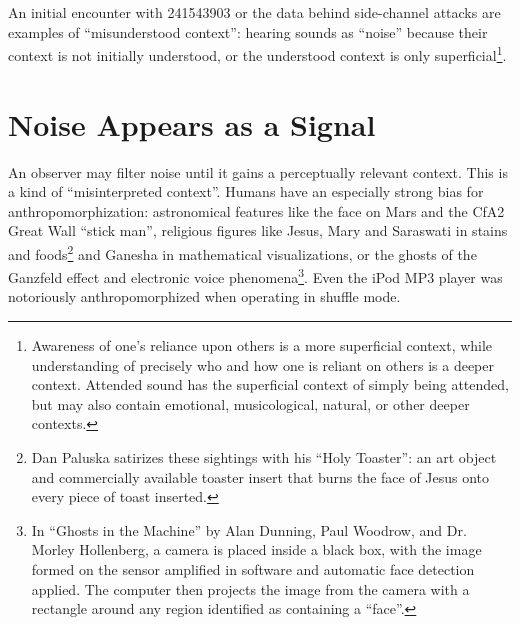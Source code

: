 \documentclass{thesis}
\begin{document}
An initial encounter with 241543903 or the data behind side-channel attacks are examples of ``misunderstood context'': hearing sounds as ``noise'' because their context is not initially understood, or the understood context is only superficial\footnote{Awareness of one's reliance upon others is a more superficial context, while understanding of precisely who and how one is reliant on others is a deeper context. Attended sound has the superficial context of simply being attended, but may also contain emotional, musicological, natural, or other deeper contexts.}.

\section{Noise Appears as a Signal}

An observer may filter noise until it gains a perceptually relevant context. This is a kind of ``misinterpreted context''. Humans have an especially strong bias for anthropomorphization: astronomical features like the face on Mars\cite{brian_dunning_facemars_2008} and the CfA2 Great Wall ``stick man''\cite{de_lapparent_slice_1986}, religious figures like Jesus, Mary and Saraswati in stains and foods\cite{boston.com_religious_????}\footnote{Dan Paluska satirizes these sightings with his ``Holy Toaster''\cite{dan_paluska_holy_2005}: an art object and commercially available toaster insert that burns the face of Jesus onto every piece of toast inserted.} and Ganesha in mathematical visualizations\cite{melinda_green_buddhabrot_1993}, or the ghosts of the Ganzfeld effect and electronic voice phenomena\footnote{In ``Ghosts in the Machine'' by Alan Dunning, Paul Woodrow, and Dr. Morley Hollenberg\cite{alan_dunning_paul_woodrow_and_morley_hollenberg_einsteins_2008}, a camera is placed inside a black box, with the image formed on the sensor amplified in software and automatic face detection applied. The computer then projects the image from the camera with a rectangle around any region identified as containing a ``face''.}. Even the iPod MP3 player was notoriously anthropomorphized when operating in shuffle mode.\cite{rachel_dodes_tuneshard_2004}
\end{document}

